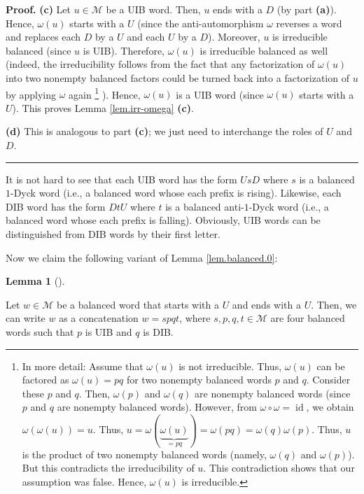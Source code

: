 \documentclass[numbers=enddot,12pt,final,onecolumn,notitlepage]{scrartcl}%
\theoremstyle{definition}
\newtheorem{lem}[theo]{Lemma}
\newenvironment{lemma}[1][]
{\begin{lem}[#1]\begin{leftbar}}
{\end{leftbar}\end{lem}}
\newenvironment{proof}[1][Proof]{\noindent\textbf{#1.} }{\ \rule{0.5em}{0.5em}}
\newcommand{\id}{\operatorname{id}}
\newcommand{\M}{\mathcal{M}}
\newenvironment{verlong}{}{}
\begin{document}
\begin{proof}
\textbf{(c)} Let $u\in\M$ be a UIB word. Then, $u$ ends with a $D$
(by part \textbf{(a)}). Hence, $\omega\left(  u\right)  $ starts with a $U$
(since the anti-automorphism $\omega$ reverses a word and replaces each $D$ by
a $U$ and each $U$ by a $D$). Moreover, $u$ is irreducible balanced (since $u$
is UIB). Therefore, $\omega\left(  u\right)  $ is irreducible balanced as well
(indeed, the irreducibility follows from the fact that any factorization of
$\omega\left(  u\right)  $ into two nonempty balanced factors could be turned
back into a factorization of $u$ by applying $\omega$ again%
\begin{verlong}
\footnote{In more
detail: Assume that $\omega\left(  u\right)  $ is not irreducible. Thus,
$\omega\left(  u\right)  $ can be factored as $\omega\left(  u\right)  =pq$
for two nonempty balanced words $p$ and $q$. Consider these $p$ and $q$. Then,
$\omega\left(  p\right)  $ and $\omega\left(  q\right)  $ are nonempty
balanced words (since $p$ and $q$ are nonempty balanced words). However, from
$\omega\circ\omega=\id$, we obtain $\omega\left(  \omega\left(
u\right)  \right)  =u$. Thus, $u=\omega\left(  \underbrace{\omega\left(
u\right)  }_{=pq}\right)  =\omega\left(  pq\right)  =\omega\left(  q\right)
\omega\left(  p\right)  $. Thus, $u$ is the product of two nonempty balanced
words (namely, $\omega\left(  q\right)  $ and $\omega\left(  p\right)  $). But
this contradicts the irreducibility of $u$. This contradiction shows that our
assumption was false. Hence, $\omega\left(  u\right)  $ is irreducible.}
\end{verlong}
).
Hence, $\omega\left(  u\right)  $ is a UIB word (since $\omega\left(
u\right)  $ starts with a $U$). This proves Lemma \ref{lem.irr-omega}
\textbf{(c)}.

\textbf{(d)} This is analogous to part \textbf{(c)}; we just need to
interchange the roles of $U$ and $D$.
\end{proof}

It is not hard to see that each UIB word has the form $UsD$ where $s$ is a balanced $1$-Dyck word (i.e., a balanced word whose each prefix is rising).
Likewise, each DIB word has the form $DtU$ where $t$ is a balanced anti-$1$-Dyck word (i.e., a balanced word whose each prefix is falling).
Obviously, UIB words can be distinguished from DIB words by their first letter.

Now we claim the following variant of Lemma \ref{lem.balanced.0}:

\begin{lemma}
\label{lem.irr.0} Let $w\in\M$ be a balanced word that starts with a
$U$ and ends with a $U$. Then, we can write $w$ as a concatenation $w=spqt$,
where $s,p,q,t\in\M$ are four balanced words such that $p$ is UIB and
$q$ is DIB.
\end{lemma}
\end{document}
